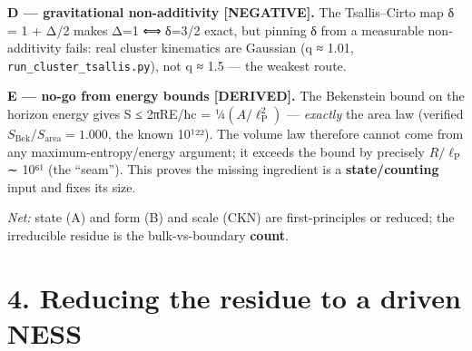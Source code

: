 \documentclass[
  10pt,
]{article}
\begin{document}
\textbf{D --- gravitational non-additivity {[}NEGATIVE{]}.} The
Tsallis--Cirto map δ = 1 + Δ/2 makes Δ=1 ⟺ δ=3/2 exact, but pinning δ
from a measurable non-additivity fails: real cluster kinematics are
Gaussian (q ≈ 1.01, \texttt{run\_cluster\_tsallis.py}), not q ≈ 1.5 ---
the weakest route.

\textbf{E --- no-go from energy bounds {[}DERIVED{]}.} The Bekenstein
bound on the horizon energy gives S ≤ 2πRE/ħc =
¼\((A/\ell _{\mathrm{P}}^{2})\) --- \emph{exactly} the area law
(verified \(S_{\mathrm{Bek}}/S_{\mathrm{area}} = 1.000\), the known
10¹²²). The volume law therefore cannot come from any
maximum-entropy/energy argument; it exceeds the bound by precisely
\(R/\ell _{\mathrm{P}}\) ∼ 10⁶¹ (the ``seam''). This proves the missing
ingredient is a \textbf{state/counting} input and fixes its size.

\emph{Net:} state (A) and form (B) and scale (CKN) are first-principles
or reduced; the irreducible residue is the bulk-vs-boundary
\textbf{count}.

\section{4. Reducing the residue to a driven
NESS}\label{reducing-the-residue-to-a-driven-ness}
\end{document}
